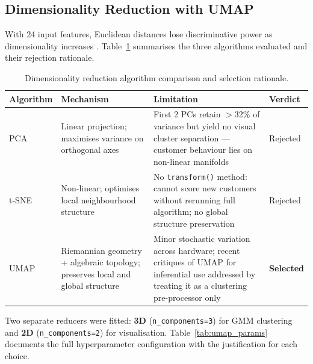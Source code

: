 \documentclass[10pt,a4paper]{article}
\begin{document}
\subsection{Dimensionality Reduction with UMAP}
\label{ssec:umap}

With 24 input features, Euclidean distances lose discriminative power as dimensionality
increases \cite{bellman1961adaptive}. Table~\ref{tab:dimred} summarises the three
algorithms evaluated and their rejection rationale.

\begin{table}[H]
\centering\small
\caption{Dimensionality reduction algorithm comparison and selection rationale.}
\label{tab:dimred}
\begin{tabular}{@{}p{1.8cm}p{3.4cm}p{3.8cm}p{2.6cm}@{}}
\toprule
\textbf{Algorithm} & \textbf{Mechanism} & \textbf{Limitation} & \textbf{Verdict} \\
\midrule
PCA & Linear projection; maximises variance on orthogonal axes & First 2 PCs retain $>$32\% of variance but yield no visual cluster separation --- customer behaviour lies on non-linear manifolds & Rejected \\[4pt]
t-SNE & Non-linear; optimises local neighbourhood structure & No \texttt{transform()} method: cannot score new customers without rerunning full algorithm; no global structure preservation & Rejected \\[4pt]
UMAP \cite{mcinnes2018umap} & Riemannian geometry + algebraic topology; preserves local and global structure & Minor stochastic variation across hardware; recent critiques of UMAP for inferential use \cite{chari2023umap} addressed by treating it as a clustering pre-processor only & \textbf{Selected} \\
\bottomrule
\end{tabular}
\end{table}

Two separate reducers were fitted: \textbf{3D} (\texttt{n\_components=3}) for GMM
clustering and \textbf{2D} (\texttt{n\_components=2}) for visualisation. Table~\ref{tab:umap_params}
documents the full hyperparameter configuration with the justification for each choice.
\end{document}
